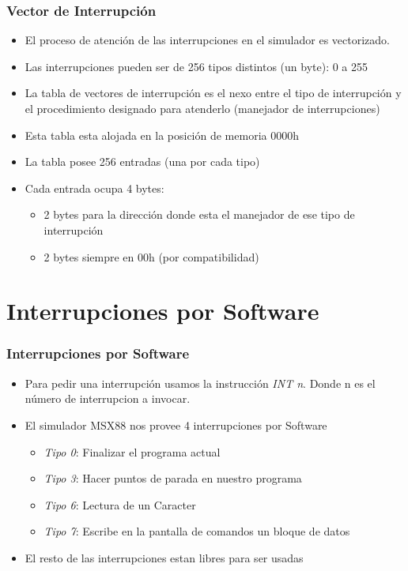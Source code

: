\documentclass{beamer}
\begin{document}
\begin{frame}
\frametitle{Vector de Interrupción}
\begin{itemize}
  \item El proceso de atención de las interrupciones en el simulador es vectorizado.
  \item Las interrupciones pueden ser de 256 tipos distintos (un byte): 0 a 255
  \item La tabla de vectores de interrupción es el nexo entre el tipo de interrupción y el procedimiento designado para atenderlo (manejador de interrupciones)
  \item Esta tabla esta alojada en la posición de memoria 0000h
  \item La tabla posee 256 entradas (una por cada tipo)
  \item Cada entrada ocupa 4 bytes: 
  \begin {itemize}
  \item 2 bytes para la dirección donde esta el manejador de ese tipo de interrupción 
  \item 2 bytes siempre en 00h (por compatibilidad)
\end{itemize}
\end{itemize}

\end{frame}


\section{Interrupciones por Software}
\begin{frame}
\frametitle{Interrupciones por Software}
\begin{itemize}
 \item Para pedir una interrupción usamos la instrucción \emph{INT n}. Donde n es el número de interrupcion a invocar.
 \item El simulador MSX88 nos provee 4 interrupciones por Software
 \begin{itemize}
   \item \emph{Tipo 0}: Finalizar el programa actual
   \item \emph{Tipo 3}: Hacer puntos de parada en nuestro programa 
   \item \emph{Tipo 6}: Lectura de un Caracter
   \item \emph{Tipo 7}: Escribe en la pantalla de comandos un bloque de datos
 \end{itemize}
 \item El resto de las interrupciones estan libres para ser usadas
\end{itemize}
\end{frame}
\end{document}

